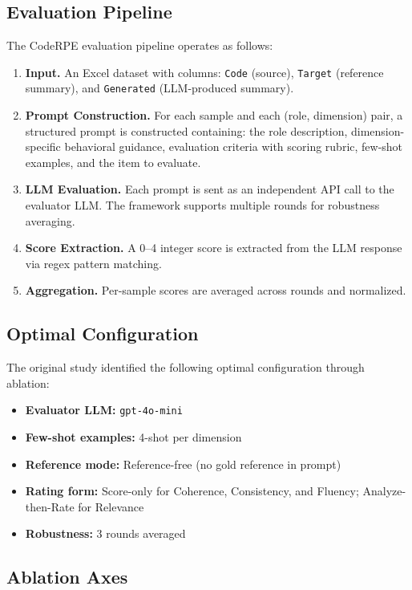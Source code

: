 \documentclass[lettersize,journal]{IEEEtran}
\begin{document}
\subsection{Evaluation Pipeline}

The CodeRPE evaluation pipeline operates as follows:

\begin{enumerate}
    \item \textbf{Input.} An Excel dataset with columns: \texttt{Code} (source), \texttt{Target} (reference summary), and \texttt{Generated} (LLM-produced summary).
    \item \textbf{Prompt Construction.} For each sample and each (role, dimension) pair, a structured prompt is constructed containing: the role description, dimension-specific behavioral guidance, evaluation criteria with scoring rubric, few-shot examples, and the item to evaluate.
    \item \textbf{LLM Evaluation.} Each prompt is sent as an independent API call to the evaluator LLM. The framework supports multiple rounds for robustness averaging.
    \item \textbf{Score Extraction.} A 0--4 integer score is extracted from the LLM response via regex pattern matching.
    \item \textbf{Aggregation.} Per-sample scores are averaged across rounds and normalized.
\end{enumerate}

\subsection{Optimal Configuration}

The original study identified the following optimal configuration through ablation:

\begin{itemize}
    \item \textbf{Evaluator LLM:} \texttt{gpt-4o-mini}
    \item \textbf{Few-shot examples:} 4-shot per dimension
    \item \textbf{Reference mode:} Reference-free (no gold reference in prompt)
    \item \textbf{Rating form:} Score-only for Coherence, Consistency, and Fluency; Analyze-then-Rate for Relevance
    \item \textbf{Robustness:} 3 rounds averaged
\end{itemize}

\subsection{Ablation Axes}
\end{document}

